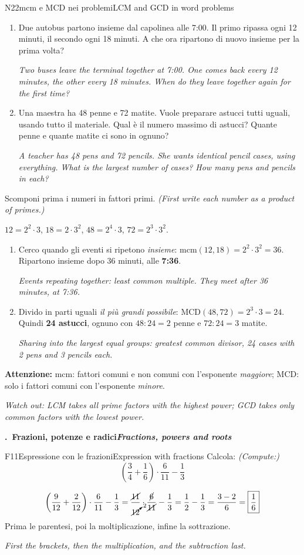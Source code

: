 \documentclass[11pt,a4paper]{article}
\newcommand{\en}[1]{\par{\small\itshape\color{engray}#1\par}}
\newcommand{\enx}[1]{{\small\itshape\color{engray}(#1)}}
\newcounter{sezione}
\newcommand{\sezione}[2]{%
  \par\addvspace{14pt}\Needspace{10\baselineskip}%
  \refstepcounter{sezione}%
  \noindent\begin{tcolorbox}[enhanced, colback=navy, colframe=navy, sharp corners,
      left=6pt, right=6pt, top=3pt, bottom=3pt, boxsep=0pt, before skip=0pt, after skip=6pt]
    {\color{white}\large\bfseries \thesezione.\ #1\hfill{\normalsize\itshape #2}}
  \end{tcolorbox}\par}
\newcommand{\errore}[2]{\begin{attenzione}\textbf{\color{fgA}Attenzione:} #1\par
  {\itshape\color{engray}Watch out: #2}\end{attenzione}}
\begin{document}
\begin{esercizio}{N2}{2}{mcm e MCD nei problemi}{LCM and GCD in word problems}
\begin{enumerate}
\item Due autobus partono insieme dal capolinea alle 7:00. Il primo ripassa ogni 12 minuti, il secondo ogni 18 minuti. A che ora ripartono di nuovo insieme per la prima volta?
\en{Two buses leave the terminal together at 7:00. One comes back every 12 minutes, the other every 18 minutes. When do they leave together again for the first time?}
\item Una maestra ha 48 penne e 72 matite. Vuole preparare astucci tutti uguali, usando tutto il materiale. Qual è il numero massimo di astucci? Quante penne e quante matite ci sono in ognuno?
\en{A teacher has 48 pens and 72 pencils. She wants identical pencil cases, using everything. What is the largest number of cases? How many pens and pencils in each?}
\end{enumerate}
Scomponi prima i numeri in fattori primi. \enx{First write each number as a product of primes.}
\end{esercizio}
\begin{solbox}
$12=2^2\cdot3$, \quad $18=2\cdot3^2$, \quad $48=2^4\cdot3$, \quad $72=2^3\cdot3^2$.
\begin{enumerate}
\item Cerco quando gli eventi si ripetono \emph{insieme}: $\text{mcm}(12,18)=2^2\cdot3^2=36$. Ripartono insieme dopo 36 minuti, alle \textbf{7:36}.
\en{Events repeating together: least common multiple. They meet after 36 minutes, at 7:36.}
\item Divido in parti uguali \emph{il più grandi possibile}: $\text{MCD}(48,72)=2^3\cdot3=24$. Quindi \textbf{24 astucci}, ognuno con $48:24=2$ penne e $72:24=3$ matite.
\en{Sharing into the largest equal groups: greatest common divisor, 24 cases with 2 pens and 3 pencils each.}
\end{enumerate}
\errore{mcm: fattori comuni e non comuni con l'esponente \emph{maggiore}; MCD: solo i fattori comuni con l'esponente \emph{minore}.}
{LCM takes all prime factors with the highest power; GCD takes only common factors with the lowest power.}
\end{solbox}

\sezione{Frazioni, potenze e radici}{Fractions, powers and roots}

\begin{esercizio}{F1}{1}{Espressione con le frazioni}{Expression with fractions}
Calcola: \enx{Compute:}
\[\left(\frac34+\frac16\right)\cdot\frac{6}{11}-\frac13\]
\end{esercizio}
\begin{solbox}
\[
\left(\frac{9}{12}+\frac{2}{12}\right)\cdot\frac{6}{11}-\frac13
=\frac{\cancel{11}}{\cancelto{2}{12}}\cdot\frac{\cancel{6}}{\cancel{11}}-\frac13
=\frac12-\frac13=\frac{3-2}{6}=\boxed{\frac16}
\]
Prima le parentesi, poi la moltiplicazione, infine la sottrazione.
\en{First the brackets, then the multiplication, and the subtraction last.}
\end{solbox}
\end{document}
